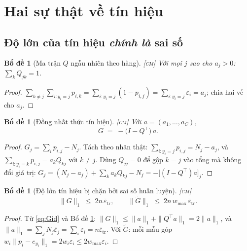 \documentclass[11pt,a4paper]{article}
\newtheorem{bode}[dinhly]{Bổ đề}
\theoremstyle{remark}
\newcommand{\epstr}{\bar\varepsilon_{\mathrm{tr}}}
\begin{document}
\section{Hai sự thật về tín hiệu}
\label{sec:haisuthat}

\subsection{Độ lớn của tín hiệu \emph{chính là} sai số}

\begin{bode}[Ma trận $Q$ ngẫu nhiên theo hàng]
\label{bd:Qstoch}
\textsc{[cm]}\; Với mọi $j$ sao cho $a_j>0$: $\sum_k Q_{jk}=1$.
\end{bode}

\begin{proof}
$\sum_{k\ne j}\sum_{i:y_i=j}p_{i,k}=\sum_{i:y_i=j}(1-p_{i,j})
 =\sum_{i:y_i=j}\varepsilon_i=a_j$; chia hai vế cho $a_j$.
\end{proof}

\begin{bode}[Đồng nhất thức tín hiệu]
\label{bd:tinhieu}
\textsc{[cm]}\; Với $a=(a_1,\dots,a_C)$,
\begin{equation}
G \;=\; -\bigl(I-Q^{\!\top}\bigr)\,a .
\label{eq:Gid}
\end{equation}
\end{bode}

\begin{proof}
$G_j=\sum_i p_{i,j}-N_j$. Tách theo nhãn thật:
$\sum_{i:y_i=j}p_{i,j}=N_j-a_j$, và $\sum_{i:y_i=k}p_{i,j}=a_kQ_{kj}$ với
$k\ne j$. Dùng $Q_{jj}=0$ để gộp $k=j$ vào tổng mà không đổi giá trị:
$G_j=(N_j-a_j)+\sum_k a_kQ_{kj}-N_j=-\bigl[(I-Q^{\!\top})a\bigr]_j$.
\end{proof}

\begin{bode}[Độ lớn tín hiệu bị chặn bởi sai số huấn luyện]
\label{bd:dolon}
\textsc{[cm]}\;
\begin{equation}
\|G\|_1 \;\le\; 2n\,\epstr,
\qquad
\|\tilde G\|_1 \;\le\; 2n\,w_{\max}\,\epstr .
\label{eq:dolon}
\end{equation}
\end{bode}

\begin{proof}
Từ \eqref{eq:Gid} và Bổ đề \ref{bd:Qstoch}:
$\|G\|_1\le\|a\|_1+\|Q^{\!\top}a\|_1=2\|a\|_1$, và
$\|a\|_1=\sum_j N_j\bar\varepsilon_j=\sum_i\varepsilon_i=n\epstr$. Với
$\tilde G$: mỗi mẫu góp $w_i\|p_i-e_{y_i}\|_1=2w_i\varepsilon_i
\le 2w_{\max}\varepsilon_i$.
\end{proof}
\end{document}
